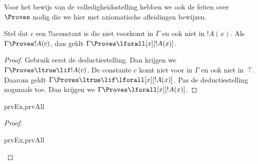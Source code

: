 \documentclass[openany]{memoir}
\begin{document}
\begingroup
\def\olfilename{OLP-0123}
\def\olfilepath{content/first-order-logic/axiomatic-deduction/}
\hypertarget{unit-OLP-0123}{}






\begin{explain}
  Voor het bewijs van de volledigheidsstelling hebben we ook de feiten
  over~$\Proves$ nodig die we hier met axiomatische afleidingen bewijzen.
\end{explain}

\begin{thm}
 Stel dat $c$ een !!a{constant} is die
niet voorkomt in $\Gamma$ en ook niet in $!A(x)$. Als
$\Gamma \Proves !A(c)$, dan geldt
$\Gamma \Proves \lforall[x][!A(x)]$.
\end{thm}

\begin{proof}
Gebruik eerst de deductiestelling. Dan krijgen we
$\Gamma \Proves \ltrue \lif !A(c)$. De constante $c$ komt niet voor
in $\Gamma$ en ook niet in~$\top$. Daarom geldt
$\Gamma \Proves \ltrue \lif \lforall[x][!A(x)]$. Pas de
deductiestelling nogmaals toe. Dan krijgen we
$\Gamma \Proves \lforall[x][!A(x)]$.
\end{proof}

\begin{prop}
\begin{tagenumerate}{prvEx,prvAll}

\end{tagenumerate}
\end{prop}

\begin{proof}
\begin{tagenumerate}{prvEx,prvAll}
\end{tagenumerate}
\end{proof}
\endgroup
\end{document}
